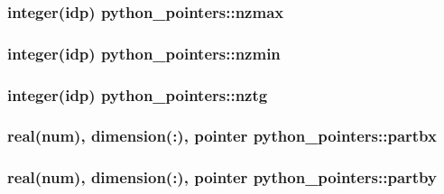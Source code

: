\subsubsection[{\texorpdfstring{nzmax}{nzmax}}]{\setlength{\rightskip}{0pt plus 5cm}integer(idp) python\+\_\+pointers\+::nzmax}\hypertarget{namespacepython__pointers_a9121a35b32fac876b7a6998f6d800fab}{}\label{namespacepython__pointers_a9121a35b32fac876b7a6998f6d800fab}
\subsubsection[{\texorpdfstring{nzmin}{nzmin}}]{\setlength{\rightskip}{0pt plus 5cm}integer(idp) python\+\_\+pointers\+::nzmin}\hypertarget{namespacepython__pointers_a6de008bd6827979eb76463e5da2f857e}{}\label{namespacepython__pointers_a6de008bd6827979eb76463e5da2f857e}
\subsubsection[{\texorpdfstring{nztg}{nztg}}]{\setlength{\rightskip}{0pt plus 5cm}integer(idp) python\+\_\+pointers\+::nztg}\hypertarget{namespacepython__pointers_a46103f36ebf9246b4fb558d8ceaee49d}{}\label{namespacepython__pointers_a46103f36ebf9246b4fb558d8ceaee49d}
\subsubsection[{\texorpdfstring{partbx}{partbx}}]{\setlength{\rightskip}{0pt plus 5cm}real(num), dimension(\+:), pointer python\+\_\+pointers\+::partbx}\hypertarget{namespacepython__pointers_a9de58f9a1f88381cac4457014ee8859f}{}\label{namespacepython__pointers_a9de58f9a1f88381cac4457014ee8859f}
\subsubsection[{\texorpdfstring{partby}{partby}}]{\setlength{\rightskip}{0pt plus 5cm}real(num), dimension(\+:), pointer python\+\_\+pointers\+::partby}\hypertarget{namespacepython__pointers_aab1fc483934951de61c30198fa476e40}{}\label{namespacepython__pointers_aab1fc483934951de61c30198fa476e40}
